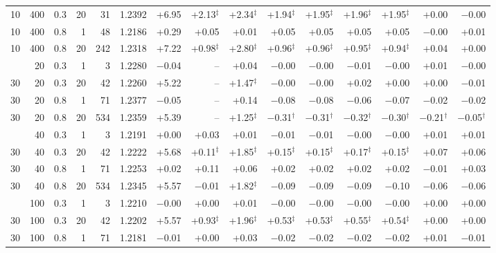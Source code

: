 \begin{tabular}{@{}rrrrr rrrrrrrrrr@{}}
10 & 400 & 0.3 & 20 & 31 & 1.2392 & +6.95 & +2.13$^{\ddagger}$ & +2.34$^{\ddagger}$ & +1.94$^{\ddagger}$ & +1.95$^{\ddagger}$ & +1.96$^{\ddagger}$ & +1.95$^{\ddagger}$ & +0.00 & $-$0.00 \\
10 & 400 & 0.8 & 1 & 48 & 1.2186 & +0.29 & +0.05 & +0.01 & +0.05 & +0.05 & +0.05 & +0.05 & $-$0.00 & +0.01 \\
10 & 400 & 0.8 & 20 & 242 & 1.2318 & +7.22 & +0.98$^{\ddagger}$ & +2.80$^{\ddagger}$ & +0.96$^{\ddagger}$ & +0.96$^{\ddagger}$ & +0.95$^{\ddagger}$ & +0.94$^{\ddagger}$ & +0.04 & +0.00 \\
\addlinespace[1pt]
30 & 20 & 0.3 & 1 & 3 & 1.2280 & $-$0.04 & -- & +0.04 & $-$0.00 & $-$0.00 & $-$0.01 & $-$0.00 & +0.01 & $-$0.00 \\
30 & 20 & 0.3 & 20 & 42 & 1.2260 & +5.22 & -- & +1.47$^{\ddagger}$ & $-$0.00 & $-$0.00 & +0.02 & +0.00 & +0.00 & $-$0.01 \\
30 & 20 & 0.8 & 1 & 71 & 1.2377 & $-$0.05 & -- & +0.14 & $-$0.08 & $-$0.08 & $-$0.06 & $-$0.07 & $-$0.02 & $-$0.02 \\
30 & 20 & 0.8 & 20 & 534 & 1.2359 & +5.39 & -- & +1.25$^{\ddagger}$ & $-$0.31$^{\dagger}$ & $-$0.31$^{\dagger}$ & $-$0.32$^{\dagger}$ & $-$0.30$^{\dagger}$ & $-$0.21$^{\dagger}$ & $-$0.05$^{\dagger}$ \\
\addlinespace[1pt]
30 & 40 & 0.3 & 1 & 3 & 1.2191 & +0.00 & +0.03 & +0.01 & $-$0.01 & $-$0.01 & $-$0.00 & $-$0.00 & +0.01 & +0.01 \\
30 & 40 & 0.3 & 20 & 42 & 1.2222 & +5.68 & +0.11$^{\ddagger}$ & +1.85$^{\ddagger}$ & +0.15$^{\ddagger}$ & +0.15$^{\ddagger}$ & +0.17$^{\ddagger}$ & +0.15$^{\ddagger}$ & +0.07 & +0.06 \\
30 & 40 & 0.8 & 1 & 71 & 1.2253 & +0.02 & +0.11 & +0.06 & +0.02 & +0.02 & +0.02 & +0.02 & $-$0.01 & +0.03 \\
30 & 40 & 0.8 & 20 & 534 & 1.2345 & +5.57 & $-$0.01 & +1.82$^{\ddagger}$ & $-$0.09 & $-$0.09 & $-$0.09 & $-$0.10 & $-$0.06 & $-$0.06 \\
\addlinespace[1pt]
30 & 100 & 0.3 & 1 & 3 & 1.2210 & $-$0.00 & +0.00 & +0.01 & $-$0.00 & $-$0.00 & $-$0.00 & $-$0.00 & +0.00 & +0.00 \\
30 & 100 & 0.3 & 20 & 42 & 1.2202 & +5.57 & +0.93$^{\ddagger}$ & +1.96$^{\ddagger}$ & +0.53$^{\ddagger}$ & +0.53$^{\ddagger}$ & +0.55$^{\ddagger}$ & +0.54$^{\ddagger}$ & +0.00 & +0.00 \\
30 & 100 & 0.8 & 1 & 71 & 1.2181 & $-$0.01 & +0.00 & +0.03 & $-$0.02 & $-$0.02 & $-$0.02 & $-$0.02 & +0.01 & $-$0.01 \\

\end{tabular}
